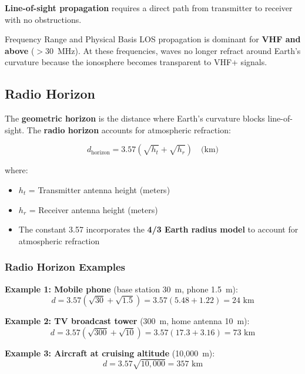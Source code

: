 \textbf{Line-of-sight propagation} requires a direct path from transmitter to receiver with no obstructions.

\begin{calloutbox}{Frequency Range and Physical Basis}
LOS propagation is dominant for \textbf{VHF and above} ($>30$~MHz). At these frequencies, waves no longer refract around Earth's curvature because the ionosphere becomes transparent to VHF+ signals.
\end{calloutbox}

\subsection{Radio Horizon}

The \textbf{geometric horizon} is the distance where Earth's curvature blocks line-of-sight. The \textbf{radio horizon} accounts for atmospheric refraction:

\begin{equation}
\label{eq:radio-horizon}
d_{\text{horizon}} = 3.57\left(\sqrt{h_t} + \sqrt{h_r}\right) \quad \text{(km)}
\end{equation}

where:
\begin{itemize}
\item $h_t$ = Transmitter antenna height (meters)
\item $h_r$ = Receiver antenna height (meters)
\item The constant 3.57 incorporates the \textbf{4/3 Earth radius model} to account for atmospheric refraction
\end{itemize}

\subsubsection{Radio Horizon Examples}

\textbf{Example 1: Mobile phone} (base station 30~m, phone 1.5~m):
\begin{equation}
d = 3.57\left(\sqrt{30} + \sqrt{1.5}\right) = 3.57(5.48 + 1.22) = 24\text{ km}
\end{equation}

\textbf{Example 2: TV broadcast tower} (300~m, home antenna 10~m):
\begin{equation}
d = 3.57\left(\sqrt{300} + \sqrt{10}\right) = 3.57(17.3 + 3.16) = 73\text{ km}
\end{equation}

\textbf{Example 3: Aircraft at cruising altitude} (10,000~m):
\begin{equation}
d = 3.57\sqrt{10{,}000} = 357\text{ km}
\end{equation}

